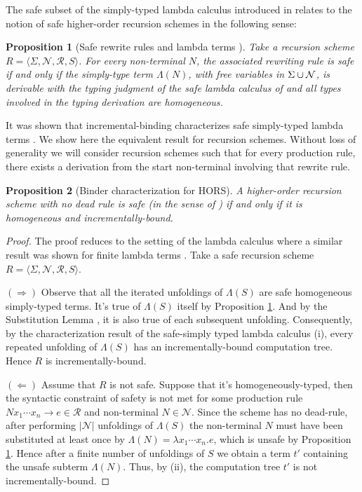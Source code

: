\documentclass[a4paper]{article}[12pt]
\newtheorem{proposition}{Proposition}[section]
\theoremstyle{remark}
\theoremstyle{definition}
\begin{document}
The safe subset of the simply-typed lambda calculus introduced in \cite{blumong:safelambdacalculus,BlumPhd} relates to the notion of safe higher-order recursion schemes in the following sense:
\begin{proposition}[Safe rewrite rules and lambda terms {\cite[Proposition 3.11]{BlumPhd}}]
\label{prop:safelambdacorresp}
Take a recursion scheme $R = \langle \Sigma, \mathcal{N}, \mathcal{R}, S \rangle$.
For every non-terminal $N$, the associated rewriting rule is safe if and only if the simply-type term $\Lambda(N)$, with free variables in $\Sigma\cup\mathcal{N}$, is derivable with the typing judgment of the safe lambda calculus of \cite{BlumPhd} and all types involved in the typing derivation are homogeneous.
\end{proposition}

It was shown that incremental-binding characterizes safe simply-typed lambda terms \cite[Proposition 5.11]{BlumPhd}. We show here the equivalent result for recursion schemes. Without loss of generality we will consider recursion schemes  such that for every production rule, there exists a derivation from the start non-terminal involving that rewrite rule.
\begin{proposition}[Binder characterization for HORS]
\label{prop:horsSafeBinderCharact}
A higher-order recursion scheme with no dead rule is \emph{safe} (in the sense of \cite{KNU02}) if and only if it is homogeneous and incrementally-bound.
\end{proposition}
\begin{proof}
The proof reduces to the setting of the lambda calculus where a similar result was shown for finite lambda terms \cite{BlumPhd}.
Take a safe recursion scheme $R = \langle \Sigma, \mathcal{N}, \mathcal{R}, S \rangle$.

$(\Longrightarrow)$ Observe that all the iterated unfoldings of $\Lambda(S)$ are safe homogeneous simply-typed terms. It's true of $\Lambda(S)$ itself by Proposition \ref{prop:safelambdacorresp}. And by the Substitution Lemma \cite[3.19]{BlumPhd}, it is also true of each subsequent unfolding. Consequently, by the characterization result of the safe-simply typed lambda calculus \cite[Proposition 5.11]{BlumPhd}(i), every repeated unfolding of $\Lambda(S)$ has an incrementally-bound computation tree. Hence $R$ is incrementally-bound.

$(\Longleftarrow)$ Assume that $R$ is not safe. Suppose that it's homogeneously-typed, then the syntactic constraint of safety is not met for some production rule $N x_1 \cdots x_n \rightarrow e \in \mathcal{R}$ and non-terminal $N \in \mathcal{N}$. Since the scheme has no dead-rule, after performing $|\mathcal{N}|$ unfoldings of $\Lambda(S)$ the non-terminal $N$ must have been substituted at least once by $\Lambda(N) = \lambda x_1 \cdots x_n. e$, which is unsafe by Proposition \ref{prop:safelambdacorresp}. Hence after a finite number of unfoldings of $S$ we obtain a term $t'$ containing the unsafe subterm $\Lambda(N)$.
Thus, by \cite[Proposition 5.11]{BlumPhd}(ii), the computation tree $t'$ is not incrementally-bound.
\end{proof}
\end{document}
